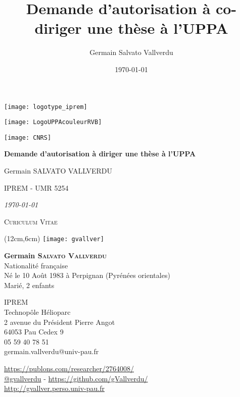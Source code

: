 \documentclass[11pt]{artuppax}
\title{Demande d'autorisation à co-diriger une thèse à l'UPPA}
\author{Germain Salvato Vallverdu}
\date{\today}
\renewcommand{\maketitle}{%
    \thispagestyle{titlepage}
    \singlespacing
    \begin{center}
        \parbox{.33\textwidth}{\texttt{[image: logotype\_iprem]}}
        \parbox{.33\textwidth}{\centering \texttt{[image: LogoUPPAcouleurRVB]}}
        \parbox{.33\textwidth}{\hfill\texttt{[image: CNRS]}}

        \vspace*{\stretch{1}}

        {\Huge\bfseries\setlength{\baselineskip}{1.2\baselineskip}%
        Demande d'autorisation à diriger une thèse à l'UPPA
        \par}

        \vspace{4ex}

        {\LARGE Germain SALVATO VALLVERDU}

        {\Large IPREM - UMR 5254}

        {\Large\itshape\today}

    \end{center}
    \vspace*{\stretch{1}}
    }
\begin{document}
%
%

\maketitle

\newpage
\setcounter{tocdepth}{1}
\tableofcontents

\newpage



%





\begin{center}
    \LARGE
    \textsc{Curiculum Vitae}
\end{center}
\vspace*{10mm}

	\begin{textblock*}{60mm}(12cm,6cm)
	    \texttt{[image: gvallver]}
	\end{textblock*}


\textbf{\large Germain \textsc{Salvato Vallverdu}} \\
Nationalité française \\
Né le 10 Août 1983 à Perpignan (Pyrénées orientales) \\
Marié, 2 enfants


\faFlask{} IPREM\\
Technopôle Hélioparc\\
2 avenue du Président Pierre Angot\\
64053 Pau Cedex 9\\
\faPhone{} 05 59 40 78 51\\
\faAt{} germain.vallverdu@univ-pau.fr \par

\faNewspaper{} \url{https://publons.com/researcher/2764008/} \\
\faGithub{} \url{@gvallverdu} \quad - \quad \url{https://github.com/gVallverdu/}\\
\faGlobe{} \url{http://gvallver.perso.univ-pau.fr}
\end{document}
